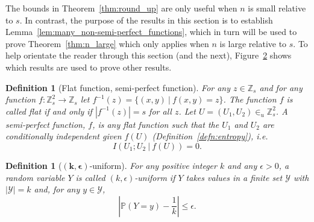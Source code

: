 \documentclass{birkjour}
\theoremstyle{indenteddefinition}
\newtheorem{defn}[thm]{Definition}
\theoremstyle{indenteddefinition}
\numberwithin{equation}{section}
\renewcommand{\P}{\mathbb{P}}
\newcommand{\Z}{\mathbb{Z}}
\begin{document}
The bounds in Theorem~\ref{thm:round_up} are only useful when $n$ is small relative to $s$. In contrast, the purpose of the results in this section is to establish Lemma~\ref{lem:many_non-semi-perfect_functions}, which in turn will be used to prove Theorem~\ref{thm:n_large} which only applies when $n$ is large relative to $s$. To help orientate the reader through this section (and the next), Figure~\ref{fig:proof_digraph} shows which results are used to prove other results.

\begin{figure}
\begin{figure}[omitted: a diagram of this paper's results, not reproduced here]\label{fig:proof_digraph}\end{figure}
\end{figure}

\begin{defn}[Flat function, semi-perfect function]
\label{defn:semi-perfect_function}
For any $z \in \Z_s$ and for any function $f : \Z_s^2 \rightarrow \Z_s$ let $f^{-1}(z) =  \{ (x,y) \: | \: f(x,y)=z \}$. The function $f$ is called \emph{flat} if and only if $|f^{-1}(z)| = s$ for all $z$. Let $U = (U_1,U_2) \in_u \Z_s^2$. A \emph{semi-perfect} function, $f$, is any flat function such that the $U_1$ and $U_2$ are conditionally independent given $f(U)$ (Definition~\ref{defn:entropy}), \emph{i.e.} 
	$$ I(U_1;U_2 \: | \: f(U)) = 0. $$
\end{defn}

\begin{defn}[$\mathbf{(k,\boldsymbol{\epsilon})}$-uniform]
\label{defn:(k,e)-uniform} 
For any positive integer $k$ and any $\epsilon >0$, a random variable $Y$ is called $(k,\epsilon)$-uniform if $Y$ takes values in a finite set $\mathcal{Y}$ with $|\mathcal{Y}| = k$ and, for any $y \in \mathcal{Y}$,
	$$ \left| \P(Y=y) - \frac{1}{k} \right| \leq \epsilon .$$

\end{defn}
\end{document}
